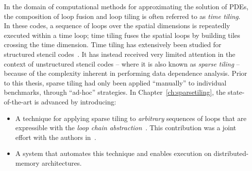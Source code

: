 In the domain of computational methods for approximating the solution of PDEs, the composition of loop fusion and loop tiling is often referred to as {\em time tiling}. In these codes, a sequence of loops over the spatial dimensions is repeatedly executed within a time loop; time tiling fuses the spatial loops by building tiles crossing the time dimension. Time tiling has extensively been studied for structured stencil codes~\citep{cohen-timetiling,ics-stencil-tiling,Zhou12,pluto}. It has instead received very limited attention in the context of unstructured stencil codes -- where it is also known as {\em sparse tiling} -- because of the complexity inherent in performing data dependence analysis. Prior to this thesis, sparse tiling had only been applied ``manually'' to individual benchmarks, through ``ad-hoc'' strategies. In Chapter~\ref{ch:sparsetiling}, the state-of-the-art is advanced by introducing:
\begin{itemize}
\item A technique for applying sparse tiling to {\it arbitrary} sequences of loops that are expressible with the {\em loop chain abstraction}~\citep{ST-KriegerHIPS2013}. This contribution was a joint effort with the authors in~\cite{st-paper}.
\item A system that automates this technique and enables execution on distributed-memory architectures.
\end{itemize}

